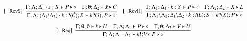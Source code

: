 \begin{figure}[!t]
\[\begin{array}{c}
		\trule{RcvS}~~\tree{
			\Gamma; \Lambda; \Delta_1 \cat k: S \proves P \hastype \Proc
			\quad
			\Gamma; \es; \Delta_2 \proves \tilde{x} \hastype \tilde{C}
		}{
			\Gamma; \Lambda; (\Delta_1\backslash\Delta_2) \cat k: \btinp{\tilde{C}} S \vdash \binp{k}{\tilde{x}} P \hastype \Proc
		}
		\quad
		\trule{RcvH}~~\tree{
			\Gamma; \Lambda_1; \Delta_1 \cat k: S \proves P \hastype \Proc
			\quad
			\Gamma; \Lambda_2; \Delta_2 \proves X \hastype L
		}{
			\Gamma; \Lambda_1\backslash\Lambda_2; \Delta_1 \backslash \Delta_2 \cat k: \btinp{L} S \proves \binp{k}{X} P \hastype \Proc
		}
		\\[6mm]


		\trule{Req}~~\tree{
				\Gamma; \es; \es \proves k \hastype U
				\quad
				\Gamma; \Lambda; \Delta_1 \proves P \hastype \Proc
				\quad
				\Gamma; \es; \Delta_2 \proves V \hastype U
		}{
			\Gamma; \Lambda; \Delta_1 \cat \Delta_2 \proves \bout{k}{V} P \hastype \Proc
		}
		\\[6mm]



\end{array}\]
\end{figure}
